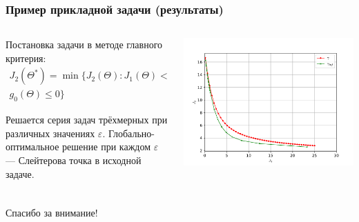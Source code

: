 \documentclass[aspectratio=169]{beamer}
\begin{document}
\begin{frame}
  \frametitle{Пример прикладной задачи (результаты)}
  \begin{columns}
    \begin{column}{0.4\textwidth}

      Постановка задачи в методе главного критерия:
      \begin{align*}
        J_2(\Theta^*)=\min\{J_2(\Theta): J_1(\Theta) < \varepsilon, \\
        g_0(\Theta)\leqslant 0\}
      \end{align*}

      Решается серия задач трёхмерных при различных значениях \(\varepsilon\). Глобально-оптимальное решение
      при каждом \(\varepsilon\) --- Слейтерова точка в исходной задаче.

    \end{column}
    \begin{column}{0.5\textwidth}
      \centerline{\includegraphics[width=1.2\textwidth]{solution.pdf}}
    \end{column}
  \end{columns}

\end{frame}

\begin{frame}{{}}
  \frametitle{ }
  \begin{center}
    \Large{Спасибо за внимание!}
  \end{center}
\end{frame}
\end{document}
